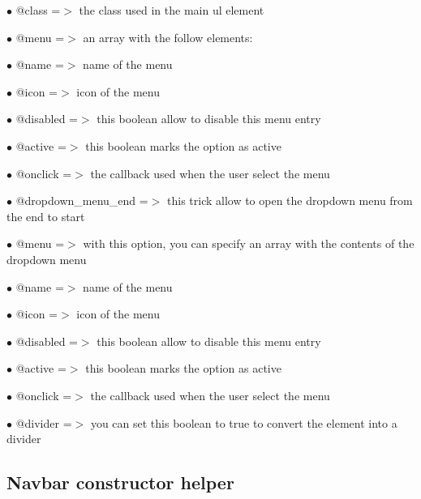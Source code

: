 \documentclass[a4paper]{book}
\begin{document}
\begin{compactitem}
\item[\color{myblue}$\bullet$] @class =$>$ the class used in the main ul element
\item[\color{myblue}$\bullet$] @menu  =$>$ an array with the follow elements:
\end{compactitem}

\begin{compactitem}
\item[\color{myblue}$\bullet$] @name              =$>$ name of the menu
\item[\color{myblue}$\bullet$] @icon              =$>$ icon of the menu
\item[\color{myblue}$\bullet$] @disabled          =$>$ this boolean allow to disable this menu entry
\item[\color{myblue}$\bullet$] @active            =$>$ this boolean marks the option as active
\item[\color{myblue}$\bullet$] @onclick           =$>$ the callback used when the user select the menu
\item[\color{myblue}$\bullet$] @dropdown\_menu\_end =$>$ this trick allow to open the dropdown menu from the end to start
\item[\color{myblue}$\bullet$] @menu              =$>$ with this option, you can specify an array with the contents of the dropdown menu
\end{compactitem}

\begin{compactitem}
\item[\color{myblue}$\bullet$] @name     =$>$ name of the menu
\item[\color{myblue}$\bullet$] @icon     =$>$ icon of the menu
\item[\color{myblue}$\bullet$] @disabled =$>$ this boolean allow to disable this menu entry
\item[\color{myblue}$\bullet$] @active   =$>$ this boolean marks the option as active
\item[\color{myblue}$\bullet$] @onclick  =$>$ the callback used when the user select the menu
\item[\color{myblue}$\bullet$] @divider  =$>$ you can set this boolean to true to convert the element into a divider
\end{compactitem}

\hypertarget{toc499}{}
\subsection{Navbar constructor helper}
\end{document}
